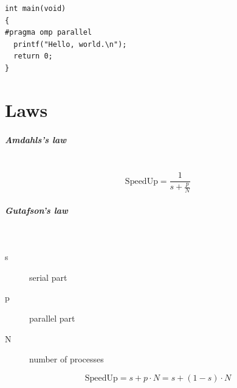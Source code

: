 \documentclass[8pt,twoside,landscape]{extarticle}
\begin{document}
\begin{multicols}{5}
\begin{lstlisting}
int main(void)
{
#pragma omp parallel
  printf("Hello, world.\n");
  return 0;
}
\end{lstlisting}
\section{Laws}
\label{sec:org172dc90}
\subparagraph{Amdahls's law} \
\label{sec:orga3acba2}
\begin{equation}
  \text{SpeedUp} = \frac{1}{s + \frac{p}{N}}
\end{equation}

\subparagraph{Gutafson's law} \
\label{sec:org8363707}
\begin{description}
\item[{s}] serial part
\item[{p}] parallel part
\item[{N}] number of processes
\end{description}
\begin{equation}
\text{SpeedUp} = s + p \cdot N = s + (1-s) \cdot N
\end{equation}


\end{multicols}
\end{document}

